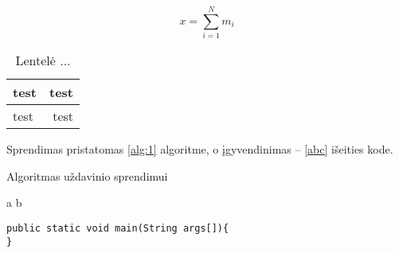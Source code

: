 \documentclass[a4paper,12pt,fleqn]{article}
\begin{document}
\begin{equation}
x = \sum_{i=1}^N m_i
\end{equation}

\begin{table}[!ht]\centering
\caption{Lentelė ... }
\label{tabl:table}
\begin{tabular}{|l|r|}\hline
test & test\\ \hline\hline
test & test\\\hline
\end{tabular}
\end{table}

Sprendimas pristatomas \ref{alg:1} algoritme, o įgyvendinimas -- \ref{abc} išeities kode.

\begin{algorithm}\caption{Algoritmas uždavinio sprendimui}
  \label{alg:1}
  \begin{algorithmic}
    \REQUIRE 
    \ENSURE 
\STATE a \AND b
\end{algorithmic}


\end{algorithm}



\begin{lstlisting}[caption={Pagrindinio metodo žingsniai},label={abc}]
public static void main(String args[]){
}
\end{lstlisting}








\end{document}
